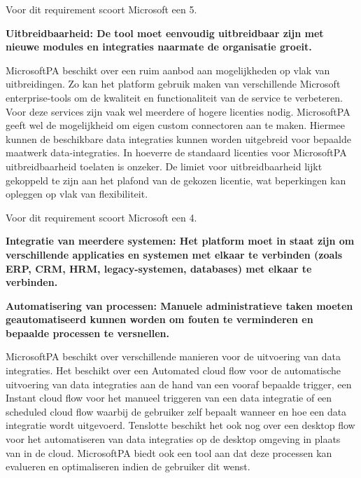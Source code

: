 Voor dit requirement scoort Microsoft een 5.

\vspace{\baselineskip}

\textbf{Uitbreidbaarheid: De tool moet eenvoudig uitbreidbaar zijn met nieuwe modules en integraties naarmate de organisatie groeit.}

\vspace{\baselineskip}

MicrosoftPA beschikt over een ruim aanbod aan mogelijkheden op vlak van uitbreidingen. Zo kan het platform gebruik maken van verschillende Microsoft enterprise-tools om de kwaliteit en functionaliteit van de service te verbeteren. Voor deze services zijn vaak wel meerdere of hogere licenties nodig. MicrosoftPA geeft wel de mogelijkheid om eigen custom connectoren aan te maken. Hiermee kunnen de beschikbare data integraties kunnen worden uitgebreid voor bepaalde maatwerk data-integraties. In hoeverre de standaard licenties voor MicrosoftPA uitbreidbaarheid toelaten is onzeker. De limiet voor uitbreidbaarheid lijkt gekoppeld te zijn aan het plafond van de gekozen licentie, wat beperkingen kan opleggen op vlak van flexibiliteit. 


Voor dit requirement scoort Microsoft een 4.


\vspace{\baselineskip}

\textbf{Integratie van meerdere systemen: Het platform moet in staat zijn om verschillende applicaties en systemen met elkaar te verbinden (zoals ERP, CRM, HRM, legacy-systemen, databases) met elkaar te verbinden.}

\vspace{\baselineskip}



\vspace{\baselineskip}

\textbf{Automatisering van processen: Manuele administratieve taken moeten geautomatiseerd kunnen worden om fouten te verminderen en bepaalde processen te versnellen.}

\vspace{\baselineskip}

MicrosoftPA beschikt over verschillende manieren voor de uitvoering van data integraties. Het beschikt over een Automated cloud flow voor de automatische uitvoering van data integraties aan de hand van een vooraf bepaalde trigger, een Instant cloud flow voor het manueel triggeren van een data integratie of een scheduled cloud flow waarbij de gebruiker zelf bepaalt wanneer en hoe een data integratie wordt uitgevoerd. Tenslotte beschikt het ook nog over een desktop flow voor het automatiseren van data integraties op de desktop omgeving in plaats van in de cloud. MicrosoftPA biedt ook een tool aan dat deze processen kan evalueren en optimaliseren indien de gebruiker dit wenst.


